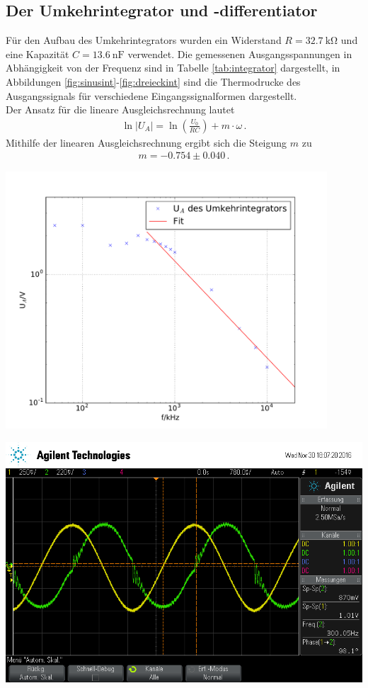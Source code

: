 \documentclass[]{scrartcl}
\begin{document}
\subsection{Der Umkehrintegrator und -differentiator}
Für den Aufbau des Umkehrintegrators wurden ein Widerstand $R=\SI{32.7}{\kilo\ohm}$ und eine Kapazität $C=\SI{13.6}{\nano\farad}$ verwendet. Die gemessenen Ausgangsspannungen in Abhängigkeit von der Frequenz sind in Tabelle \ref{tab:integrator} dargestellt, in Abbildungen \ref{fig:sinusint}-\ref{fig:dreieckint} sind die Thermodrucke des Ausgangssignals für verschiedene Eingangssignalformen dargestellt. \\
Der Ansatz für die lineare Ausgleichsrechnung lautet
\begin{align}
\ln |U_A| = \ln\left(\frac{U_0}{RC}\right)+m\cdot\omega\,.
\end{align}
Mithilfe der linearen Ausgleichsrechnung ergibt sich die Steigung $m$ zu
\begin{align*}
m = -0.754\pm 0.040\,.
\end{align*}
\begin{center}
	\includegraphics[width=12cm]{images/integrator.pdf}
	\label{fig:integrator}
\end{center}
\begin{minipage}[t]{0.5\textwidth}
	\includegraphics[width=\textwidth]{images/sinus_int}
	\label{fig:sinusint}
\end{minipage}
\end{document}
